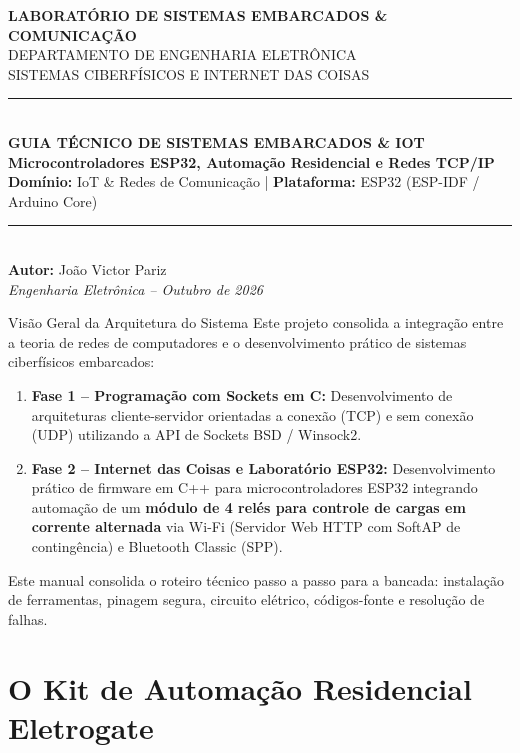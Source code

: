\documentclass[a4paper,11pt]{article}
\begin{document}
\begin{center}
    {\large \textbf{LABORATÓRIO DE SISTEMAS EMBARCADOS \& COMUNICAÇÃO}}\\[2mm]
    {\large DEPARTAMENTO DE ENGENHARIA ELETRÔNICA}\\[1mm]
    {\normalsize SISTEMAS CIBERFÍSICOS E INTERNET DAS COISAS}\\[4mm]
    \rule{\textwidth}{1.2pt}\\[3mm]
    {\LARGE \textbf{\color{primary}GUIA TÉCNICO DE SISTEMAS EMBARCADOS \& IOT}}\\[2mm]
    {\Large \textbf{Microcontroladores ESP32, Automação Residencial e Redes TCP/IP}}\\[2mm]
    {\normalsize \textbf{Domínio:} IoT \& Redes de Comunicação \quad | \quad \textbf{Plataforma:} ESP32 (ESP-IDF / Arduino Core)}\\[1mm]
    \rule{\textwidth}{1.2pt}\\[3mm]
    \textbf{Autor:} João Victor Pariz\\[1mm]
    \textit{Engenharia Eletrônica -- Outubro de 2026}
\end{center}

\vspace{1mm}

\begin{infobox}{Visão Geral da Arquitetura do Sistema}
Este projeto consolida a integração entre a teoria de redes de computadores e o desenvolvimento prático de sistemas ciberfísicos embarcados:
\begin{enumerate}[leftmargin=*]
    \item \textbf{Fase 1 -- Programação com Sockets em C:} Desenvolvimento de arquiteturas cliente-servidor orientadas a conexão (TCP) e sem conexão (UDP) utilizando a API de Sockets BSD / Winsock2.
    \item \textbf{Fase 2 -- Internet das Coisas e Laboratório ESP32:} Desenvolvimento prático de firmware em C++ para microcontroladores ESP32 integrando automação de um \textbf{módulo de 4 relés para controle de cargas em corrente alternada} via Wi-Fi (Servidor Web HTTP com SoftAP de contingência) e Bluetooth Classic (SPP).
\end{enumerate}
Este manual consolida o roteiro técnico passo a passo para a bancada: instalação de ferramentas, pinagem segura, circuito elétrico, códigos-fonte e resolução de falhas.
\end{infobox}

\section{O Kit de Automação Residencial Eletrogate}
\end{document}
